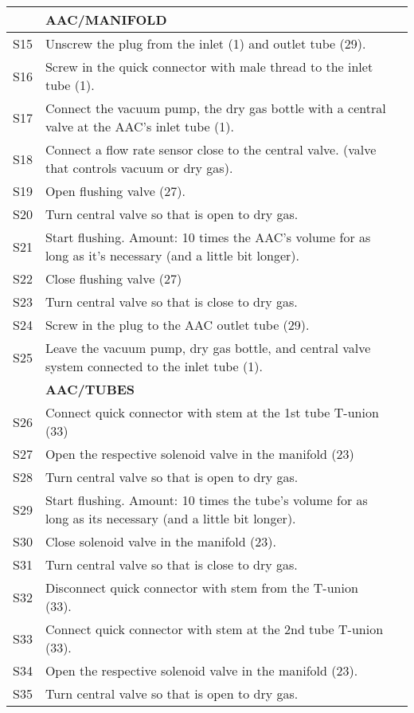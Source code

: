 \begin{longtable} {|m{}|m{}|m{}|}
& \textbf{AAC/MANIFOLD} & \\ \hline
S15 & Unscrew the plug from the inlet (1) and outlet tube (29). & \\ \hline
S16 & Screw in the quick connector with male thread to the inlet tube (1). & \\ \hline
S17 & Connect the vacuum pump, the dry gas bottle with a central valve at the AAC's inlet tube (1). & \\ \hline
S18 & Connect a flow rate sensor close to the central valve. (valve that controls vacuum or dry gas). & \\ \hline
S19 & Open flushing valve (27). & \\ \hline
S20 & Turn central valve so that is open to dry gas. & \\ \hline
S21 & Start flushing. Amount: 10 times the AAC's volume for as long as it's necessary (and a little bit longer). & \\ \hline
S22 & Close flushing valve (27) & \\ \hline
S23 & Turn central valve so that is close to dry gas. & \\ \hline
S24 & Screw in the plug to the AAC outlet tube (29). & \\ \hline
S25 & Leave the vacuum pump, dry gas bottle, and central valve system connected to the inlet tube (1). & \\ \hline
&  \textbf{AAC/TUBES} & \\ \hline
S26 & Connect quick connector with stem at the 1st tube T-union (33) & \\ \hline
S27 & Open the respective solenoid valve in the manifold (23) & \\ \hline
S28 & Turn central valve so that is open to dry gas. & \\ \hline
S29 & Start flushing. Amount: 10 times the tube's volume for as long as its necessary (and a little bit longer). & \\ \hline
S30 & Close solenoid valve in the manifold (23). & \\ \hline
S31 & Turn central valve so that is close to dry gas. & \\ \hline
S32 & Disconnect quick connector with stem from the T-union (33). & \\ \hline
S33 & Connect quick connector with stem at the 2nd tube T-union (33). & \\ \hline
S34 & Open the respective solenoid valve in the manifold (23). & \\ \hline
S35 & Turn central valve so that is open to dry gas. & \\ \hline

\end{longtable}

